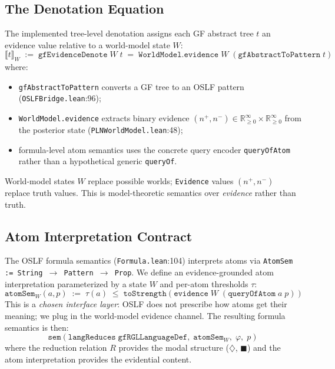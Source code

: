 \documentclass[11pt]{article}
\newcommand{\code}[1]{\texttt{#1}}
\newcommand{\Dia}{\ensuremath{\diamondsuit}}
\newcommand{\Bx}{\ensuremath{\blacksquare}}
\newcommand{\OSLF}{\textup{OSLF}}
\newcommand{\GF}{\textup{GF}}
\begin{document}
\subsection{The Denotation Equation}

The implemented tree-level denotation assigns each \GF{} abstract tree $t$ an
evidence value relative to a world-model state $W$:
\begin{equation}
\label{eq:denote}
  \llbracket t \rrbracket_W
    \;:=\; \texttt{gfEvidenceDenote}\; W\; t
    \;=\; \texttt{WorldModel.evidence}\; W\;
           (\texttt{gfAbstractToPattern}\; t)
\end{equation}
where:
\begin{itemize}
\item \code{gfAbstractToPattern} converts a \GF{} tree to an \OSLF{}
  pattern (\code{OSLFBridge.lean}:96);
\item \code{WorldModel.evidence} extracts binary evidence $(n^+, n^-)
  \in \mathbb{R}_{\ge 0}^{\infty} \times \mathbb{R}_{\ge 0}^{\infty}$
  from the posterior state (\code{PLNWorldModel.lean}:48);
\item formula-level atom semantics uses the concrete query encoder
  \code{queryOfAtom} rather than a hypothetical generic \code{queryOf}.
\end{itemize}
World-model states $W$ replace possible worlds; \code{Evidence} values
$(n^+, n^-)$ replace truth values.  This is model-theoretic semantics
over \emph{evidence} rather than truth.

\subsection{Atom Interpretation Contract}

The \OSLF{} formula semantics (\code{Formula.lean}:104) interprets atoms
via \code{AtomSem := String $\to$ Pattern $\to$ Prop}.  We define an
evidence-grounded atom interpretation parameterized by a state $W$ and
per-atom thresholds $\tau$:
\[
  \texttt{atomSem}_W(a, p)
    \;:=\;
    \tau(a) \;\le\; \texttt{toStrength}(\texttt{evidence}\; W\;
                      (\texttt{queryOfAtom}\; a\; p))
\]
This is a \emph{chosen interface layer}: \OSLF{} does not prescribe how
atoms get their meaning; we plug in the world-model evidence channel.
The resulting formula semantics is then:
\[
  \texttt{sem}(\texttt{langReduces}\; \texttt{gfRGLLanguageDef},\;
               \texttt{atomSem}_W,\; \varphi,\; p)
\]
where the reduction relation $R$ provides the modal structure ($\Dia$, $\Bx$)
and the atom interpretation provides the evidential content.
\end{document}
